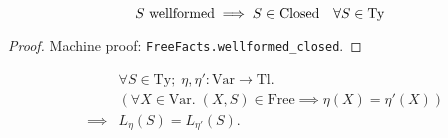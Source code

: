 \documentclass{llncs}
\newcommand*{\Var}{\mathrm{Var}}
\newcommand*{\Ty}{\mathrm{Ty}}
\newcommand*{\Tl}{\mathrm{Tl}}
\newcommand*{\Free}{\mathrm{Free}}
\newcommand*{\Closed}{\mathrm{Closed}}
\newcommand*{\wf}[1]{\text{$#1$ {\normalfont \rmfamily wellformed}}}
\renewcommand*{\|}{\;|\;}
\newcommand*{\machproofc}[1]{Machine proof: \code{#1}.}
\newcommand*{\code}[1]{\texttt{#1}}
\begin{document}
\begin{lemma}
  \label{lemma:wellformed_closed}
  \begin{equation*}
    \wf{S} \implies S \in \Closed \quad \forall S \in \Ty
  \end{equation*}
\end{lemma}

\begin{proof}
  \machproofc{FreeFacts.wellformed\_closed}
\end{proof}


\begin{lemma}
  \label{lemma:eta_irrelevant1}
  \begin{eqnarray*}
    &&         \forall S \in \Ty;\; \eta, \eta'\colon \Var \to \Tl. \\
    &&         (\forall X \in \Var.\; (X, S) \in \Free \implies \eta(X) = \eta'(X)) \\
    &\implies& L_\eta(S) = L_{\eta'}(S).
  \end{eqnarray*}
\end{lemma}
\end{document}
